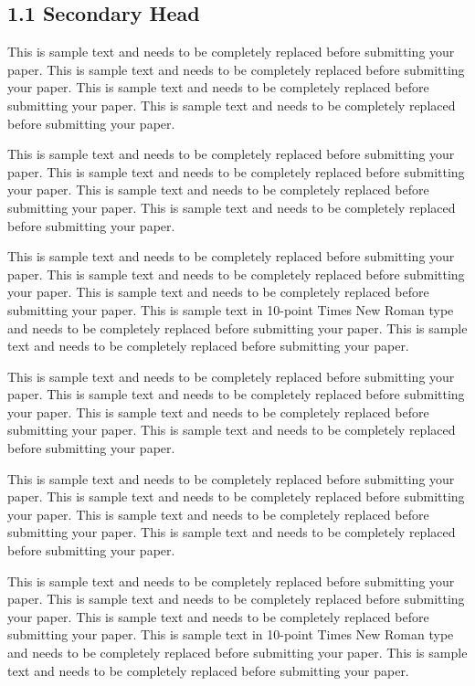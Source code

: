 \documentclass[]{asaproc}
\begin{document}
\subsection*{1.1 Secondary Head}

This is sample text and needs to be completely replaced before
submitting your paper. This is sample text and needs to be completely
replaced before submitting your paper. This is sample text and needs to
be completely replaced before submitting your paper. This is sample text
and needs to be completely replaced before submitting your paper.

This is sample text and needs to be completely replaced before
submitting your paper. This is sample text and needs to be completely
replaced before submitting your paper. This is sample text and needs to
be completely replaced before submitting your paper. This is sample text
and needs to be completely replaced before submitting your paper.

This is sample text and needs to be completely replaced before
submitting your paper. This is sample text and needs to be completely
replaced before submitting your paper. This is sample text and needs to
be completely replaced before submitting your paper. This is sample text
in 10-point Times New Roman type and needs to be completely replaced
before submitting your paper. This is sample text and needs to be
completely replaced before submitting your paper.

This is sample text and needs to be completely replaced before
submitting your paper. This is sample text and needs to be completely
replaced before submitting your paper. This is sample text and needs to
be completely replaced before submitting your paper. This is sample text
and needs to be completely replaced before submitting your paper.

This is sample text and needs to be completely replaced before
submitting your paper. This is sample text and needs to be completely
replaced before submitting your paper. This is sample text and needs to
be completely replaced before submitting your paper. This is sample text
and needs to be completely replaced before submitting your paper.

This is sample text and needs to be completely replaced before
submitting your paper. This is sample text and needs to be completely
replaced before submitting your paper. This is sample text and needs to
be completely replaced before submitting your paper. This is sample text
in 10-point Times New Roman type and needs to be completely replaced
before submitting your paper. This is sample text and needs to be
completely replaced before submitting your paper.
\end{document}
